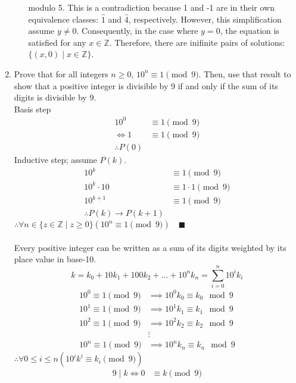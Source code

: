 \documentclass[letterpaper, 12pt]{article}
\newcommand{\qed}{\quad \blacksquare}
\newcommand{\then}{\rightarrow}
\newcommand{\Z}{\mathbb{Z}}
\newcommand{\0}{\emptyset}
\begin{document}
\begin{enumerate}
\begin{enumerate}
\begin{flushleft}
        modulo 5. This is a contradiction because 1 and -1 are in their own equivalence classes: 
        $\hat{1}$ and $\hat{4}$, respectively. However, this simplification assume $y \ne 0$. 
        Consequently, in the case where $y = 0$, the equation is satisfied for any $x \in \Z$. 
        Therefore, there are inifinite pairs of solutions: $\{(x, 0) \mid x \in \Z\}$.
    \end{flushleft}
    \end{enumerate}
    \pagebreak
    \item Prove that for all integers $n \ge 0$, $10^n \equiv 1 \pmod 9$. Then, use that result to show 
    that a positive integer is divisible by 9 if and only if the sum of its digits is divisible by 9. \\
    Basis step
    \begin{align*}
        10^0 &\equiv 1 \pmod 9 \\
        \iff 1 &\equiv 1 \pmod 9 \\
        \therefore P(0)
    \end{align*}
    Inductive step; assume $P(k)$.
    \begin{align*}
        10^k &\equiv 1 \pmod 9 \\
        10^k \cdot 10 &\equiv 1 \cdot 1 \pmod 9 \\
        10^{k+1} &\equiv 1 \pmod 9 \\
        \therefore P(k) \then P(k+1)
    \end{align*}
    $\therefore \forall n \in \{z \in \Z \mid z \ge 0\} (10^n \equiv 1 \pmod 9) \qed$ \\
    \\
    Every positive integer can be written as a sum of its digits weighted by its place value in base-10.
    \[k = k_0 + 10k_1 + 100k_2 + \dots + 10^nk_n = \sum_{i=0}^{n} 10^ik_i\]
    \begin{align*}
        10^0 \equiv 1 \pmod 9 &\implies 10^0k_0 \equiv k_0 \mod 9 \\
        10^1 \equiv 1 \pmod 9 &\implies 10^1k_1 \equiv k_1 \mod 9 \\
        10^2 \equiv 1 \pmod 9 &\implies 10^2k_2 \equiv k_2 \mod 9 \\
        &\vdots \\
        10^n \equiv 1 \pmod 9 &\implies 10^nk_n \equiv k_n \mod 9
    \end{align*}
    $\therefore \forall 0 \le i \le n (10^ik^i \equiv k_i \pmod 9)$
    \begin{align*}
        9 \mid k \iff 0 &\equiv k \pmod 9 \\

\end{align*}
\end{enumerate}
\end{document}

